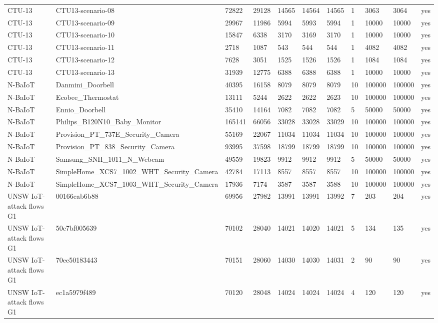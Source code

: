 \begin{tabular}{lllllllllll}
CTU-13 & CTU13-scenario-08 & 72822 & 29128 & 14565 & 14564 & 14565 & 1 & 3063 & 3064 & yes \\
CTU-13 & CTU13-scenario-09 & 29967 & 11986 & 5994 & 5993 & 5994 & 1 & 10000 & 10000 & yes \\
CTU-13 & CTU13-scenario-10 & 15847 & 6338 & 3170 & 3169 & 3170 & 1 & 10000 & 10000 & yes \\
CTU-13 & CTU13-scenario-11 & 2718 & 1087 & 543 & 544 & 544 & 1 & 4082 & 4082 & yes \\
CTU-13 & CTU13-scenario-12 & 7628 & 3051 & 1525 & 1526 & 1526 & 1 & 1084 & 1084 & yes \\
CTU-13 & CTU13-scenario-13 & 31939 & 12775 & 6388 & 6388 & 6388 & 1 & 10000 & 10000 & yes \\
N-BaIoT & Danmini\_Doorbell & 40395 & 16158 & 8079 & 8079 & 8079 & 10 & 100000 & 100000 & yes \\
N-BaIoT & Ecobee\_Thermostat & 13111 & 5244 & 2622 & 2622 & 2623 & 10 & 100000 & 100000 & yes \\
N-BaIoT & Ennio\_Doorbell & 35410 & 14164 & 7082 & 7082 & 7082 & 5 & 50000 & 50000 & yes \\
N-BaIoT & Philips\_B120N10\_Baby\_Monitor & 165141 & 66056 & 33028 & 33028 & 33029 & 10 & 100000 & 100000 & yes \\
N-BaIoT & Provision\_PT\_737E\_Security\_Camera & 55169 & 22067 & 11034 & 11034 & 11034 & 10 & 100000 & 100000 & yes \\
N-BaIoT & Provision\_PT\_838\_Security\_Camera & 93995 & 37598 & 18799 & 18799 & 18799 & 10 & 100000 & 100000 & yes \\
N-BaIoT & Samsung\_SNH\_1011\_N\_Webcam & 49559 & 19823 & 9912 & 9912 & 9912 & 5 & 50000 & 50000 & yes \\
N-BaIoT & SimpleHome\_XCS7\_1002\_WHT\_Security\_Camera & 42784 & 17113 & 8557 & 8557 & 8557 & 10 & 100000 & 100000 & yes \\
N-BaIoT & SimpleHome\_XCS7\_1003\_WHT\_Security\_Camera & 17936 & 7174 & 3587 & 3587 & 3588 & 10 & 100000 & 100000 & yes \\
UNSW IoT-attack flows G1 & 00166cab6b88 & 69956 & 27982 & 13991 & 13991 & 13992 & 7 & 203 & 204 & yes \\
UNSW IoT-attack flows G1 & 50c7bf005639 & 70102 & 28040 & 14021 & 14020 & 14021 & 5 & 134 & 135 & yes \\
UNSW IoT-attack flows G1 & 70ee50183443 & 70151 & 28060 & 14030 & 14030 & 14031 & 2 & 90 & 90 & yes \\
UNSW IoT-attack flows G1 & ec1a5979f489 & 70120 & 28048 & 14024 & 14024 & 14024 & 4 & 120 & 120 & yes \\

\end{tabular}

